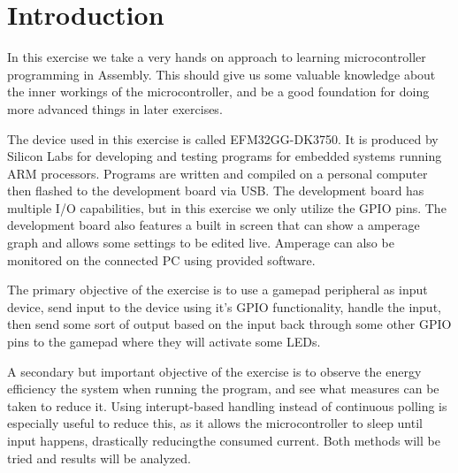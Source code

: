 \chapter{Introduction}
In this exercise we take a very hands on approach to learning microcontroller programming in Assembly. This should give us some valuable knowledge about the inner workings of the microcontroller, and be a good foundation for doing more advanced things in later exercises.

The device used in this exercise is called EFM32GG-DK3750. It is produced by Silicon Labs for developing and testing programs for embedded systems running ARM processors. Programs are written and compiled on a personal computer then flashed to the development board via USB. The development board has multiple I/O capabilities, but in this exercise we only utilize the GPIO pins. The development board also features a built in screen that can show a amperage graph and allows some settings to be edited live. Amperage can also be monitored on the connected PC using provided software.

The primary objective of the exercise is to use a gamepad peripheral as input device, send input to the device using it's GPIO functionality, handle the input, then send some sort of output based on the input back through some other GPIO pins to the gamepad where they will activate some LEDs.

A secondary but important objective of the exercise is to observe the energy efficiency the system when running the program, and see what measures can be taken to reduce it. Using interupt-based handling instead of continuous polling is especially useful to reduce this, as it allows the microcontroller to sleep until input happens, drastically reducingthe consumed current. Both methods will be tried and results will be analyzed.


